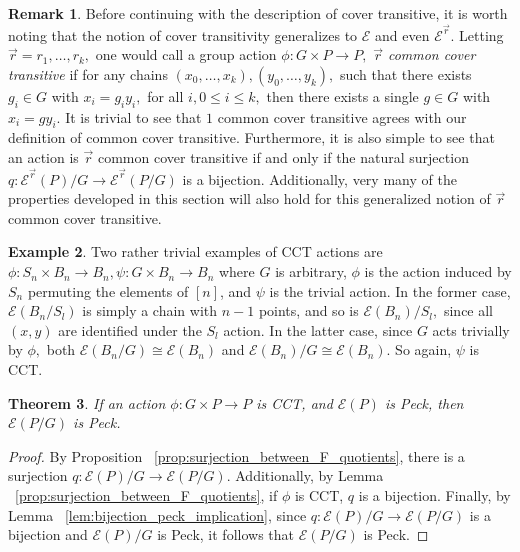 \documentclass[10 pt]{amsart}
\theoremstyle{plain}
\newtheorem{thm}{Theorem}[section]
\theoremstyle{definition}
\newtheorem{rem}[thm]{Remark}
\newtheorem{eg}[thm]{Example}
\theoremstyle{remark}
\numberwithin{equation}{section}
\renewcommand{\vec}[1]{\overrightarrow{#1}}
\begin{document}
\begin{rem}
Before continuing with the description of cover transitive, it is worth noting that the notion of cover transitivity generalizes to $\mathcal E$ and even $\mathcal E^{\vec r}.$ Letting $\vec r = r_1,\ldots, r_k,$ one would call a group action $\phi:G\times P \rightarrow P,$ {\it $\vec r$ common cover transitive} if for any chains $(x_0,\ldots, x_k),(y_0,\ldots, y_k),$ such that there exists $g_i \in G$ with $x_i = g_i y_i,$ for all $i,0\leq i \leq k,$ then there exists a single $g \in G$ with $x_i = g y_i.$ It is trivial to see that $1$ common cover transitive agrees with our definition of common cover transitive. Furthermore, it is also simple to see that an action is $\vec r$ common cover transitive if and only if the natural surjection $q:\mathcal E^{\vec r}(P)/G \rightarrow \mathcal E^{\vec r}(P/G)$ is a bijection. Additionally, very many of the properties developed in this section will also hold for this generalized notion of $\vec r$ common cover transitive.
\end{rem}

\begin{eg}
\label{eg:trivial_edgequot}
Two rather trivial examples of CCT actions are $\phi:S_n\times B_n \rightarrow B_n,\psi:G\times B_n\rightarrow B_n$ where $G$ is arbitrary, $\phi$ is the action induced by $S_n$ permuting the elements of $[n]$, and $\psi$ is the trivial action. In the former case, $\mathcal E(B_n/S_l)$ is simply a chain with $n-1$ points, and so is $\mathcal E(B_n)/S_l,$ since all $(x, y)$ are identified under the $S_l$ action. In the latter case, since $G$ acts trivially by $\phi,$ both  $\mathcal E(B_n/G) \cong \mathcal E(B_n)$ and $\mathcal E(B_n)/G \cong \mathcal E(B_n).$ So again, $\psi$ is CCT.
\end{eg}

\begin{thm}
If an action $\phi:G \times P \rightarrow P$ is CCT, and $\mathcal E(P)$ is Peck, then $\mathcal E(P/G)$ is Peck.
\end{thm}
\begin{proof}
By Proposition ~\ref{prop:surjection_between_F_quotients}, there is a surjection $q:\mathcal E(P)/G \rightarrow \mathcal E(P/G).$ Additionally, by Lemma ~\ref{prop:surjection_between_F_quotients}, if $\phi$ is CCT, $q$ is a bijection. Finally, by Lemma ~\ref{lem:bijection_peck_implication}, since $q:\mathcal E(P)/G \rightarrow \mathcal E(P/G)$ is a bijection and $\mathcal E(P)/G$ is Peck, it follows that $\mathcal E(P/G)$ is Peck.
\end{proof}
\end{document}
